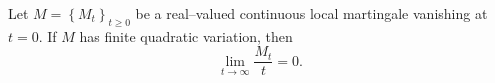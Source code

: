 %
\begin{lemma}\label{lem.marting}
	Let $Μ = \left\{M_t\right\}_{t \geq 0}$ be a real--valued continuous local 
	martingale vanishing at $t = 0$. 
	If $M$ has finite quadratic variation, then
	$$
		\lim_{t \to \infty} \frac{M_t}{t}=0.
	$$
\end{lemma}